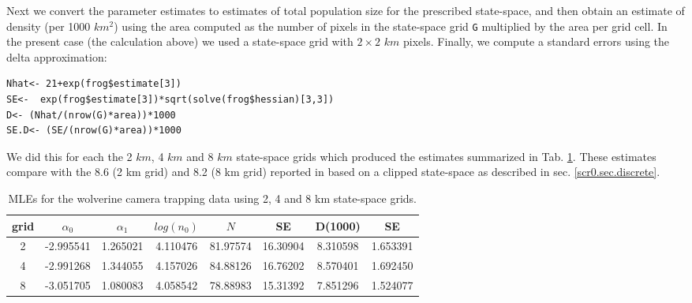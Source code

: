 Next we convert the parameter estimates to estimates of total
population size for the prescribed state-space, and then obtain an
estimate of density (per 1000
$km^2$) using the area computed as the number of pixels in the
state-space grid \mbox{\tt G} multiplied by the area per grid cell. In
the present case (the calculation above) we used a state-space grid
with $2 \times 2$ $km$ pixels.  Finally, we compute
a standard errors using the delta approximation: 
\begin{verbatim}
Nhat<- 21+exp(frog$estimate[3])
SE<-  exp(frog$estimate[3])*sqrt(solve(frog$hessian)[3,3])
D<- (Nhat/(nrow(G)*area))*1000
SE.D<- (SE/(nrow(G)*area))*1000
\end{verbatim}
We did this for each the 2 $km$, 4 $km$ and 8 $km$ state-space grids
which produced the estimates summarized in Tab. \ref{mle.tab.wolv}.
These estimates compare with the 8.6 (2 km grid) and 8.2 (8 km grid)
reported in 
\citet{royle_etal:2011jwm} based on a clipped state-space as described
in sec. \ref{scr0.sec.discrete}.

\begin{table}
\centering
\caption{MLEs for the wolverine camera trapping data using 2, 4 and 8 km state-space grids.}
\begin{tabular}{cccccccc}
\hline \hline
grid &  $\alpha_0$  &  $\alpha_1$ &   $log(n_0)$  & $N$   &  SE & D(1000) &  SE \\ \hline
2  &  -2.995541& 1.265021 &4.110476 &81.97574& 16.30904 &8.310598 &1.653391\\
4  &  -2.991268&1.344055  &4.157026 &84.88126& 16.76202 &8.570401& 1.692450\\
8   & -3.051705& 1.080083 &4.058542 &78.88983& 15.31392 &7.851296& 1.524077\\   \hline
\end{tabular}
\label{mle.tab.wolv}
\end{table}


\begin{comment}
\subsection{
Exercises
}

{\flushleft
1.	Compute the 95\% confidence interval for wolverine density,
somehow. Comment on the practical implication of this level of precision.
}

{\flushleft
2.	Compute the AIC of this model and modify \mbox{\tt intlik3}
 to consider alternative link functions (at least one additional) and
 compare the  AIC of the different models and the estimates. Comment. 
}
\end{comment}


